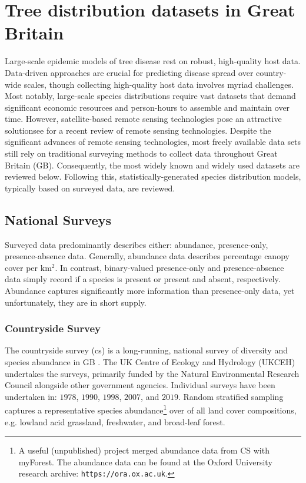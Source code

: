\newpage

\section{Tree distribution datasets in Great Britain}
\label{ch2:hostdata}

Large-scale epidemic models of tree disease rest on robust, high-quality host data.
Data-driven approaches are crucial for predicting disease spread over country-wide scales, 
though collecting high-quality host data involves myriad challenges. 
Most notably, large-scale species distributions require vast datasets that demand significant economic resources
and person-hours to assemble and maintain over time. 
However, satellite-based remote sensing technologies pose an attractive solution\textemdash see \cite{camarretta2020monitoring} for a recent review of remote sensing technologies.
Despite the significant advances of remote sensing technologies, most freely available data sets still rely on traditional surveying methods to collect data throughout Great Britain (GB).
Consequently, the most widely known and widely used datasets are reviewed below.
Following this, statistically-generated species distribution models, typically based on surveyed data, are reviewed.

\subsection{National Surveys}
\label{sec:nationa-surveyes}

Surveyed data predominantly describes either: abundance, presence-only, presence-absence data. 
Generally, abundance data describes percentage canopy cover per $\mathrm{km^2}$.
In contrast, binary-valued presence-only and presence-absence data simply record if a species is present or present and absent, respectively.
Abundance captures significantly more information than presence-only data, yet unfortunately, they are in short supply.

\subsubsection{Countryside Survey}

The countryside survey (\acrshort{cs}) is a long-running, national survey of diversity and species abundance in GB \cite{wood2017long}.
The UK Centre of Ecology and Hydrology (UKCEH) undertakes the surveys, primarily funded by the Natural Environmental Research Council alongside other government agencies.
Individual surveys have been undertaken in: $1978$, $1990$, $1998$, $2007$, and $2019$. 
Random stratified sampling captures a representative species abundance\footnote{
A useful (unpublished) project merged abundance data from CS with myForest. The abundance data can be found at the Oxford University research archive: \nolinkurl{https://ora.ox.ac.uk}.} 
over of all land cover compositions, e.g. lowland acid grassland, freshwater, and broad-leaf forest.

